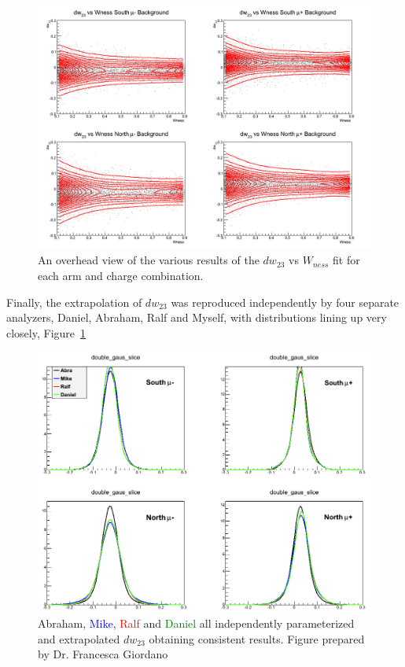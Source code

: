 \begin{figure}
  \centering
  \includegraphics[width=\linewidth]{./figures/c_WnessVsdw23.png}
  \caption{
    An overhead view of the various results of the $dw_{23}$ vs $W_{ness}$ fit
    for each arm and charge combination.
  }
\end{figure}

Finally, the extrapolation of $dw_{23}$ was reproduced independently by four
separate analyzers, Daniel, Abraham, Ralf and Myself, with distributions lining
up very closely, Figure~\ref{fig:four_dw23}

\begin{figure}
  \centering
  \includegraphics[width=0.7\linewidth]{./figures/dw23_fourway.png}
  \caption{
    Abraham, \textcolor{blue}{Mike}, \textcolor{red}{Ralf} and
    \textcolor{green}{Daniel} all independently parameterized and extrapolated
    $dw_{23}$ obtaining consistent results. Figure prepared by Dr. Francesca
    Giordano~\cite{Seidl2014a}
  }
  \label{fig:four_dw23}
\end{figure}

